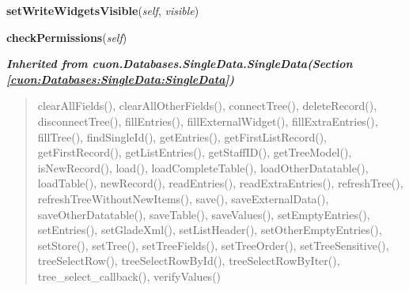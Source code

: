     \label{cuon:DMS:SingleDMS:SingleDMS:setWriteWidgetsVisible}

    \vspace{0.5ex}

\hspace{.8\funcindent}\begin{boxedminipage}{\funcwidth}

    \raggedright \textbf{setWriteWidgetsVisible}(\textit{self}, \textit{visible})

\setlength{\parskip}{2ex}
\setlength{\parskip}{1ex}
    \end{boxedminipage}

    \label{cuon:DMS:SingleDMS:SingleDMS:checkPermissions}

    \vspace{0.5ex}

\hspace{.8\funcindent}\begin{boxedminipage}{\funcwidth}

    \raggedright \textbf{checkPermissions}(\textit{self})

\setlength{\parskip}{2ex}
\setlength{\parskip}{1ex}
    \end{boxedminipage}


\large{\textbf{\textit{Inherited from cuon.Databases.SingleData.SingleData\textit{(Section \ref{cuon:Databases:SingleData:SingleData})}}}}

\begin{quote}
clearAllFields(), clearAllOtherFields(), connectTree(), deleteRecord(), disconnectTree(), fillEntries(), fillExternalWidget(), fillExtraEntries(), fillTree(), findSingleId(), getEntries(), getFirstListRecord(), getFirstRecord(), getListEntries(), getStaffID(), getTreeModel(), isNewRecord(), load(), loadCompleteTable(), loadOtherDatatable(), loadTable(), newRecord(), readEntries(), readExtraEntries(), refreshTree(), refreshTreeWithoutNewItems(), save(), saveExternalData(), saveOtherDatatable(), saveTable(), saveValues(), setEmptyEntries(), setEntries(), setGladeXml(), setListHeader(), setOtherEmptyEntries(), setStore(), setTree(), setTreeFields(), setTreeOrder(), setTreeSensitive(), treeSelectRow(), treeSelectRowById(), treeSelectRowByIter(), tree\_select\_callback(), verifyValues()
\end{quote}

